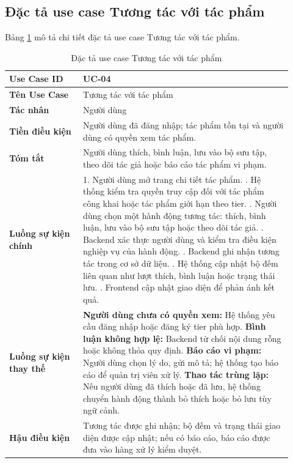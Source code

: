 \subsection{Đặc tả use case Tương tác với tác phẩm}
\label{subsection:2.3.4}

Bảng \ref{table:2_5} mô tả chi tiết đặc tả use case Tương tác với tác phẩm.
\begin{table}[h!]
    \caption{Đặc tả use case Tương tác với tác phẩm}
    \label{table:2_5}
\centering
\small
\renewcommand{\arraystretch}{1.2}
\begin{tabular}{|p{0.24\linewidth}|p{0.68\linewidth}|}
\hline
\textbf{Use Case ID} & UC-04 \\
\hline
\textbf{Tên Use Case} & Tương tác với tác phẩm \\
\hline
\textbf{Tác nhân} & Người dùng \\
\hline
\textbf{Tiền điều kiện} & Người dùng đã đăng nhập; tác phẩm tồn tại và người dùng có quyền xem tác phẩm. \\
\hline
\textbf{Tóm tắt} & Người dùng thích, bình luận, lưu vào bộ sưu tập, theo dõi tác giả hoặc báo cáo tác phẩm vi phạm. \\
\hline
\textbf{Luồng sự kiện chính} &
1. Người dùng mở trang chi tiết tác phẩm. \newline
2. Hệ thống kiểm tra quyền truy cập đối với tác phẩm công khai hoặc tác phẩm giới hạn theo tier. \newline
3. Người dùng chọn một hành động tương tác: thích, bình luận, lưu vào bộ sưu tập hoặc theo dõi tác giả. \newline
4. Backend xác thực người dùng và kiểm tra điều kiện nghiệp vụ của hành động. \newline
5. Backend ghi nhận tương tác trong cơ sở dữ liệu. \newline
6. Hệ thống cập nhật bộ đếm liên quan như lượt thích, bình luận hoặc trạng thái lưu. \newline
7. Frontend cập nhật giao diện để phản ánh kết quả. \\
\hline
\textbf{Luồng sự kiện thay thế} &
\textbf{Người dùng chưa có quyền xem:} Hệ thống yêu cầu đăng nhập hoặc đăng ký tier phù hợp. \newline
\textbf{Bình luận không hợp lệ:} Backend từ chối nội dung rỗng hoặc không thỏa quy định. \newline
\textbf{Báo cáo vi phạm:} Người dùng chọn lý do, gửi mô tả; hệ thống tạo báo cáo để quản trị viên xử lý. \newline
\textbf{Thao tác trùng lặp:} Nếu người dùng đã thích hoặc đã lưu, hệ thống chuyển hành động thành bỏ thích hoặc bỏ lưu tùy ngữ cảnh. \\
\hline
\textbf{Hậu điều kiện} & Tương tác được ghi nhận; bộ đếm và trạng thái giao diện được cập nhật; nếu có báo cáo, báo cáo được đưa vào hàng xử lý kiểm duyệt. \\
\hline
\end{tabular}
\end{table}
\FloatBarrier


